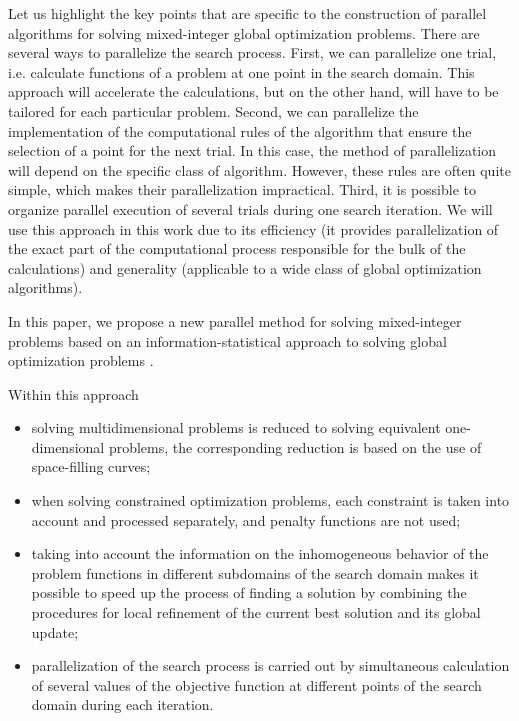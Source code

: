 \documentclass[
11pt,%
tightenlines,%
twoside,%
onecolumn,%
nofloats,%
nobibnotes,%
nofootinbib,%
superscriptaddress,%
noshowpacs,%
centertags]%
{revtex4}
\begin{document}
Let us highlight the key points that are specific to the construction of parallel algorithms for solving mixed-integer global optimization problems. There are several ways to parallelize the search process.
First, we can parallelize one trial, i.e. calculate functions of a problem at one point in the search domain. This approach will accelerate the calculations, but on the other hand, will have to be tailored for each particular problem.
Second, we can parallelize the implementation of the computational rules of the algorithm that ensure the selection of a point for the next trial. In this case, the method of parallelization will depend on the specific class of algorithm. However, these rules are often quite simple, which makes their parallelization impractical.
Third, it is possible to organize parallel execution of several trials during one search iteration. We will use this approach in this work due to its efficiency (it provides parallelization of the exact part of the computational process responsible for the bulk of the calculations) and generality (applicable to a wide class of global optimization algorithms).

In this paper, we propose a new parallel method for solving mixed-integer problems based on an information-statistical approach to solving global optimization problems \cite{Strongin2000,Strongin2013}. 

Within this approach 
\begin{itemize}
	\item 
	solving multidimensional problems is reduced to solving equivalent one-dimensional problems, the corresponding reduction is based on the use of space-filling curves;
	\item 
	when solving constrained optimization problems, each constraint is taken into account and processed separately, and penalty functions are not used;
	\item
	taking into account the information on the inhomogeneous behavior of the problem functions in different subdomains of the search domain makes it possible to speed up the process of finding a solution by combining the procedures for local refinement of the current best solution and its global update;
	\item 
	parallelization of the search process is carried out by simultaneous calculation of several values of the objective function at different points of the search domain during each iteration.	
\end{itemize}
\end{document}
